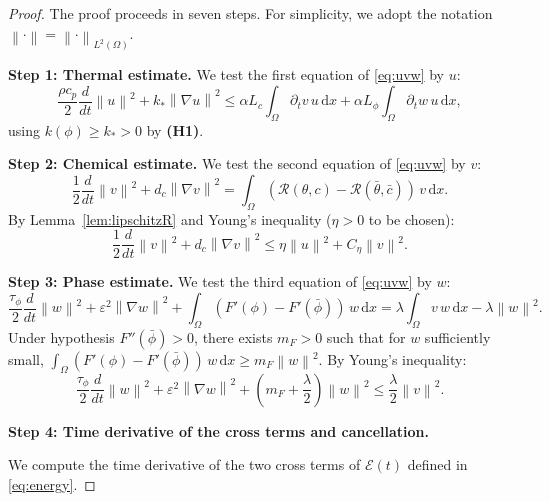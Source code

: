 \documentclass[final,1p,times]{elsarticle}
\newcommand{\dx}{\,\mathrm{d}x}
\numberwithin{equation}{section}
\newcommand{\norm}[1]{\left\|#1\right\|}
\newcommand{\ptn}{\partial_t}
\begin{document}
	\begin{proof}
		The proof proceeds in seven steps. For simplicity, we adopt the notation $\norm{\cdot} = \norm{\cdot}_{L^2(\Omega)}$.
		
		\medskip
		\textbf{Step 1: Thermal estimate.}
		We test the first equation of \eqref{eq:uvw} by $u$:
		\begin{equation}
			\label{eq3}
			\frac{\rho c_p}{2}\frac{d}{dt}\norm{u}^2 + k_*\norm{\nabla u}^2
			\leq \alpha L_c \int_\Omega \ptn v\,u\dx + \alpha L_\phi \int_\Omega \ptn w\,u\dx,
		\end{equation}
		using $k(\phi) \geq k_* > 0$ by \textbf{(H1)}.
		
		\medskip
		\textbf{Step 2: Chemical estimate.}
		We test the second equation of \eqref{eq:uvw} by $v$:
		\[
		\frac12\frac{d}{dt}\norm{v}^2 + d_c\norm{\nabla v}^2
		= \int_\Omega (\mathcal{R}(\theta,c) - \mathcal{R}(\bar\theta,\bar c))\,v\dx.
		\]
		By Lemma~\ref{lem:lipschitzR} and Young's inequality ($\eta > 0$ to be chosen):
		\begin{equation}
			\label{eq:v-est}
			\frac12\frac{d}{dt}\norm{v}^2 + d_c\norm{\nabla v}^2
			\leq \eta\norm{u}^2 + C_\eta\norm{v}^2.
		\end{equation}
		
		\medskip
		\textbf{Step 3: Phase estimate.}
		We test the third equation of \eqref{eq:uvw} by $w$:
		\[
		\frac{\tau_\phi}{2}\frac{d}{dt}\norm{w}^2 + \varepsilon^2\norm{\nabla w}^2
		+ \int_\Omega (F'(\phi)-F'(\bar\phi))\,w\dx
		= \lambda\int_\Omega v\,w\dx - \lambda\norm{w}^2.
		\]
		Under hypothesis $F''(\bar\phi) > 0$, there exists $m_F > 0$ such that for $w$ sufficiently small,
		$\int_\Omega (F'(\phi)-F'(\bar\phi))\,w\dx \geq m_F\norm{w}^2$. By Young's inequality:
		\begin{equation}
			\label{eq:w-est}
			\frac{\tau_\phi}{2}\frac{d}{dt}\norm{w}^2 + \varepsilon^2\norm{\nabla w}^2
			+ \left(m_F + \frac\lambda2\right)\norm{w}^2
			\leq \frac\lambda2\norm{v}^2.
		\end{equation}
		
		\medskip
		\noindent\textbf{Step 4: Time derivative of the cross terms and cancellation.}
		
		We compute the time derivative of the two cross terms of
		$\mathcal{E}(t)$ defined in \eqref{eq:energy}.
		

\end{proof}
\end{document}
